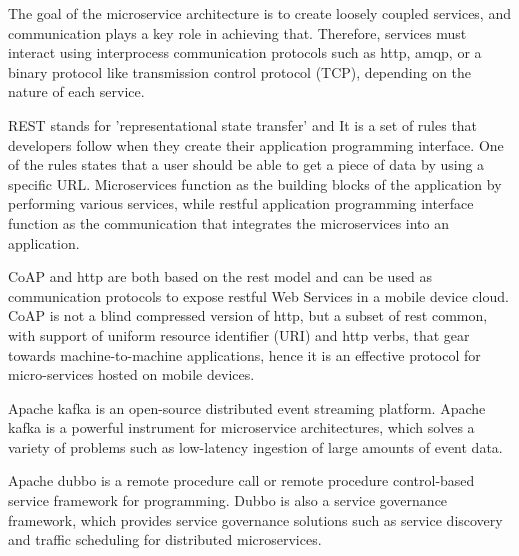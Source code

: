 The goal of the microservice architecture is to create loosely coupled services, and communication plays a key role in achieving that. Therefore, services must interact using interprocess communication protocols such as http, amqp, or a binary protocol like transmission control protocol (TCP), depending on the nature of each service. %

REST stands for 'representational state transfer' and It is a set of rules that developers follow when they create their application programming interface.\cite{Zhang2019, Ndungu2019} One of the rules states that a user should be able to get a piece of data by using a specific URL.\cite{Koschel2017, Branko2018} Microservices function as the building blocks of the application by performing various services, while restful application programming interface function as the communication that integrates the microservices into an application.\cite{Johansson2019, Zaytev2018, liu2018,  chauvel2018}

CoAP and http are both based on the rest model and can be used as communication protocols to expose restful Web Services in a mobile device cloud. %
CoAP is not a blind compressed version of http, but a subset of rest common, with support of uniform resource identifier (URI) and http verbs, that gear towards machine-to-machine applications, hence it is an effective protocol for micro-services hosted on mobile devices.\cite{liu2018, khan2017}

Apache kafka is an open-source distributed event streaming platform. Apache kafka is a powerful instrument for microservice architectures, which solves a variety of problems such as low-latency ingestion of large amounts of event data.\cite{wang2020, ebay}

Apache dubbo is a remote procedure call or remote procedure control-based service framework for programming. Dubbo is also a service governance framework, which provides service governance solutions such as service discovery and traffic scheduling for distributed microservices.\cite{Zhang2019}



